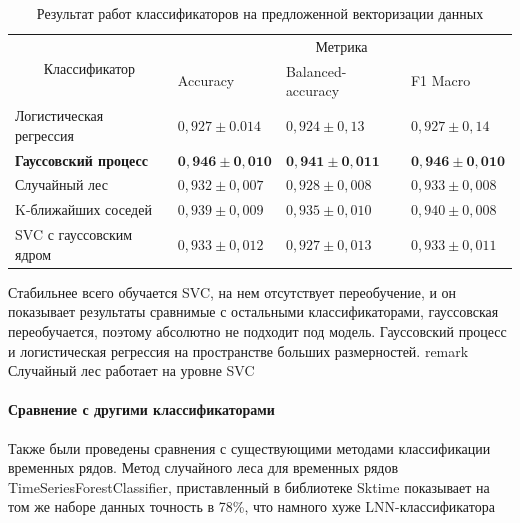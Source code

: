 \documentclass[a4paper, 12pt]{article}
\begin{document}
\begin{table}[!htbp]
    \centering
    \begin{tabular}{|l|lll|}
    \hline
    \multicolumn{1}{|c|}{\multirow{2}{*}{Классификатор}} & \multicolumn{3}{c|}{Метрика}                                                                     \\ \cline{2-4} 
    \multicolumn{1}{|c|}{}                               & \multicolumn{1}{l|}{Accuracy}         & \multicolumn{1}{l|}{Balanced-accuracy} & F1 Macro        \\ \hline
    Логистическая регрессия                              & \multicolumn{1}{l|}{$0,927 \pm  0.014$} & \multicolumn{1}{l|}{$0,924 \pm 0,13$}    & $0,927 \pm 0,14$  \\ \hline
    \textbf{Гауссовский процесс}                                  & \multicolumn{1}{l|}{$\mathbf{0,946} \pm \mathbf{0,010}$}  & \multicolumn{1}{l|}{$\mathbf{0,941} \pm \mathbf{0,011}$}   & $\mathbf{0,946} \pm \mathbf{0,010}$ \\ \hline
    Случайный лес                                        & \multicolumn{1}{l|}{$0,932 \pm 0,007$}  & \multicolumn{1}{l|}{$0,928 \pm 0,008$}   & $0,933 \pm 0,008$ \\ \hline
    K-ближайших соседей                                  & \multicolumn{1}{l|}{$0,939 \pm 0,009$}  & \multicolumn{1}{l|}{$0,935 \pm 0,010$}   & $0,940 \pm 0,008$ \\ \hline
    SVC с гауссовским ядром                              & \multicolumn{1}{l|}{$0,933 \pm 0,012$}  & \multicolumn{1}{l|}{$0,927 \pm 0,01$3}   & $0,933 \pm 0,011$ \\ \hline
    \end{tabular}
    \caption{Результат работ классификаторов на предложенной векторизации данных}
    \label{table:classifictors}
\end{table}

Стабильнее всего обучается SVC, на нем отсутствует переобучение, и он показывает результаты сравнимые с остальными классификаторами, гауссовская переобучается, поэтому абсолютно не подходит под модель. Гауссовский процесс и логистическая регрессия на пространстве больших размерностей. remark Случайный лес работает на уровне SVC

\paragraph{Сравнение с другими классификаторами}
Также были проведены сравнения с существующими методами классификации временных рядов. Метод случайного леса для временных рядов TimeSeriesForestClassifier, приставленный в библиотеке Sktime показывает на том же наборе данных точность в 78\%, что намного хуже LNN-классификатора
\end{document}
